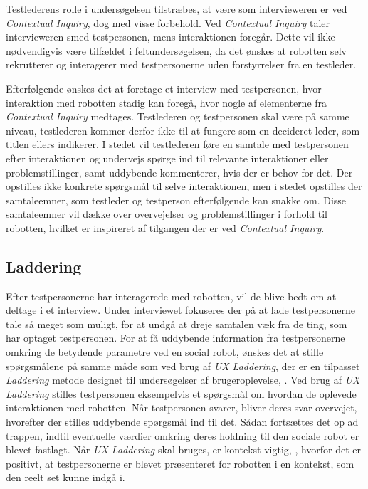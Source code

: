 Testlederens rolle i undersøgelsen tilstræbes, at være som intervieweren er ved \textit{Contextual Inquiry}, dog med visse forbehold. Ved \textit{Contextual Inquiry} taler intervieweren smed testpersonen, mens interaktionen foregår. Dette vil ikke nødvendigvis være tilfældet i feltundersøgelsen, da det ønskes at robotten selv rekrutterer og interagerer med testpersonerne uden forstyrrelser fra en testleder. 

Efterfølgende ønskes det at foretage et interview med testpersonen, hvor interaktion med robotten stadig kan foregå, hvor nogle af elementerne fra \textit{Contextual Inquiry} medtages. Testlederen og testpersonen skal være på samme niveau, testlederen kommer derfor ikke til at fungere som en decideret leder, som titlen ellers indikerer. I stedet vil testlederen føre en samtale med testpersonen efter interaktionen og undervejs spørge ind til relevante interaktioner eller problemstillinger, samt uddybende kommenterer, hvis der er behov for det. Der opstilles ikke konkrete spørgsmål til selve interaktionen, men i stedet opstilles der samtaleemner, som testleder og testperson efterfølgende kan snakke om. Disse samtaleemner vil dække over overvejelser og problemstillinger i forhold til robotten, hvilket er inspireret af tilgangen der er ved \textit{Contextual Inquiry}.
%
\subsection{Laddering}
\label{ParametreLaddering}
%
Efter testpersonerne har interagerede med robotten, vil de blive bedt om at deltage i et interview. Under interviewet fokuseres der på at lade testpersonerne tale så meget som muligt, for at undgå at dreje samtalen væk fra de ting, som har optaget testpersonen. For at få uddybende information fra testpersonerne omkring de betydende parametre ved en social robot, ønskes det at stille spørgsmålene på samme måde som ved brug af \textit{UX Laddering}, der er en tilpasset \textit{Laddering} metode designet til undersøgelser af brugeroplevelse, \parencite[ss. 3-4]{PDF:LadderingTheUserExperience}. 
Ved brug af \textit{UX Laddering} stilles testpersonen eksempelvis et spørgsmål om hvordan de oplevede interaktionen med robotten. Når testpersonen svarer, bliver deres svar overvejet, hvorefter der stilles uddybende spørgsmål ind til det. Sådan fortsættes det op ad trappen, indtil eventuelle værdier omkring deres holdning til den sociale robot er blevet fastlagt. Når \textit{UX Laddering} skal bruges, er kontekst vigtig, \parencite[s. 3]{PDF:LadderingTheUserExperience}, hvorfor det er positivt, at testpersonerne er blevet præsenteret for robotten i en kontekst, som den reelt set kunne indgå i. 

